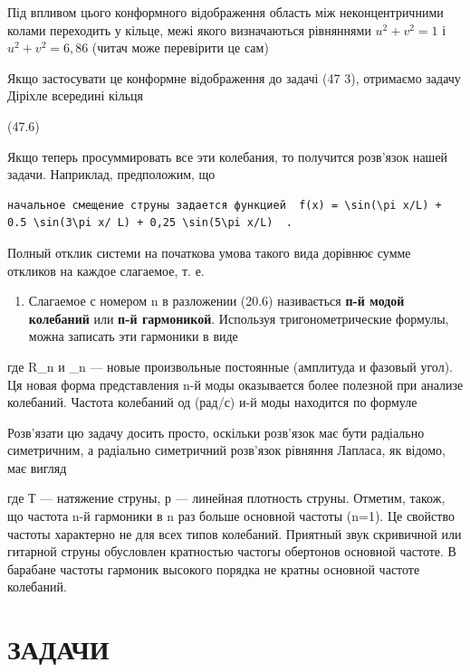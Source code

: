 \documentclass[
  ukrainian,
]{article}
\providecommand{\tightlist}{%
  \setlength{\itemsep}{0pt}\setlength{\parskip}{0pt}}
\begin{document}
Під впливом цього конформного відображення область між неконцентричними
колами переходить у кільце, межі якого визначаються рівняннями
\(u^2 + v^2 = 1\) і \(u^2 + v^2 = 6,86\) (читач може перевірити це сам)

Якщо застосувати це конформне відображення до задачі (47 3), отримаємо
задачу Діріхле всередині кільця

(47.6)

Якщо теперь просуммировать все эти колебания, то получится розв'язок
нашей задачи. Наприклад, предположим, що

\begin{verbatim}
начальное смещение струны задается функцией  f(x) = \sin(\pi x/L) + 0.5 \sin(3\pi x/ L) + 0,25 \sin(5\pi x/L)  .
\end{verbatim}

Полный отклик системи на початкова умова такого вида дорівнює сумме
откликов на каждое слагаемое, т. е.

\begin{enumerate}
\def\labelenumi{\arabic{enumi}.}
\setcounter{enumi}{1}
\tightlist
\item
  Слагаемое с номером n в разложении (20.6) називається \textbf{п-й
  модой колебаний} или \textbf{п-й гармоникой}. Используя
  тригонометрические формулы, можна записать эти гармоники в виде
\end{enumerate}

где R\_n и \delta\_n --- новые произвольные постоянные (амплитуда и
фазовый угол). Ця новая форма представления n-й моды оказывается более
полезной при анализе колебаний. Частота колебаний од (рад/с) и-й моды
находится по формуле

Розв'язати цю задачу досить просто, оскільки розв'язок має бути
радіально симетричним, а радіально симетричний розв'язок рівняння
Лапласа, як відомо, має вигляд

где Т --- натяжение струны, р --- линейная плотность струны. Отметим,
також, що частота n-й гармоники в n раз больше основной частоты (n=1).
Це свойство частоты характерно не для всех типов колебаний. Приятный
звук скривичной или гитарной струны обусловлен кратностью частогы
обертонов основной частоте. В барабане частоты гармоник высокого порядка
не кратны основной частоте колебаний.

\section{ЗАДАЧИ}\label{ux437ux430ux434ux430ux447ux438-4}
\end{document}
